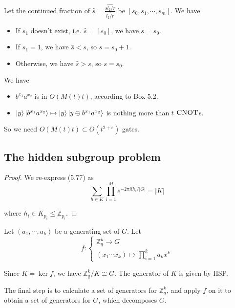 \documentclass[../main.tex]{subfiles}
\begin{document}
\bigskip
\begin{exercise}
\end{exercise}
Let the continued fraction of $\widehat{s}=\frac{\widehat{s l_2/r}}{\widehat{l_2/r}}$ be $[s_0,s_1,\cdots,s_m]$. We have
\begin{itemize}
    \item If $s_1$ doesn't exist, i.e. $\hat{s}=[s_0]$, we have $s=s_0$.
    \item If $s_1=1$, we have $\hat{s}<s$, so $s=s_0+1$.
    \item Otherwise, we have $\hat{s}>s$, so $s=s_0$.
\end{itemize}

\bigskip
\begin{exercise}
\end{exercise}
We have
\begin{itemize}
    \item $b^{x_1}a^{x_2}$ is in $O(M(t)t)$, according to Box 5.2.
    \item $\ket{y}\ket{b^{x_1}a^{x_2}}\mapsto\ket{y}\ket{y\oplus b^{x_1}a^{x_2}}$ is nothing more than $t$ $\textsc{CNOT}$s.
\end{itemize}

So we need $O(M(t)t)\subset O(t^{2+\varepsilon})$ gates.

\subsection{The hidden subgroup problem}
\begin{exercise}
\end{exercise}
\begin{proof}
We re-express (5.77) as
\[
    \sum_{h\in K}\prod_{i=1}^M e^{-2\pi i l h_i/\lvert G\rvert}=\lvert K\rvert
\]

where $h_i\in K_{p_i}\leq\mathbb{Z}_{p_i}$.
\end{proof}

\bigskip
\begin{exercise}
\end{exercise}
Let $(a_1,\cdots,a_k)$ be a generating set of $G$. Let
\[
    f:\begin{cases}\mathbb{Z}_q^k\to G\\(x_1\cdots x_k)\mapsto\prod_{i=1}^k a_k x^k\end{cases}
\]

Since $K=\ker f$, we have $\mathbb{Z}_q^k/K\cong G$. The generator of $K$ is given by HSP.

The final step is to calculate a set of generators for $\mathbb{Z}_q^k$, and apply $f$ on it to obtain a set of generators for $G$, which decomposes $G$. \cite{DBLP:journals/corr/cs-DS-0101004}
\end{document}

